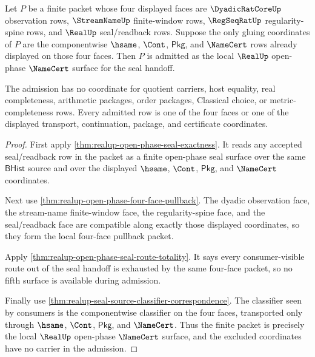 \begin{theorem}
\label{thm:realup-open-phase-four-face-namecert-admission}
Let $P$ be a finite packet whose four displayed faces are
$\DyadicRatCoreUp$ observation rows, $\StreamNameUp$ finite-window rows,
$\RegSeqRatUp$ regularity-spine rows, and $\RealUp$ seal/readback rows.
Suppose the only gluing coordinates of $P$ are the componentwise $\hsame$,
$\Cont$, $\mathsf{Pkg}$, and $\NameCert$ rows already displayed on those four
faces. Then $P$ is admitted as the local $\RealUp$ open-phase $\NameCert$
surface for the seal handoff.

The admission has no coordinate for quotient carriers, host equality, real
completeness, arithmetic packages, order packages, Classical choice, or
metric-completeness rows. Every admitted row is one of the four faces or one of
the displayed transport, continuation, package, and certificate coordinates.
\end{theorem}
\begin{proof}
First apply \autoref{thm:realup-open-phase-seal-exactness}. It reads any
accepted seal/readback row in the packet as a finite open-phase seal surface
over the same $\mathsf{BHist}$ source and over the displayed $\hsame$, $\Cont$,
$\mathsf{Pkg}$, and $\NameCert$ coordinates.

Next use \autoref{thm:realup-open-phase-four-face-pullback}. The dyadic
observation face, the stream-name finite-window face, the regularity-spine
face, and the seal/readback face are compatible along exactly those displayed
coordinates, so they form the local four-face pullback packet.

Apply \autoref{thm:realup-open-phase-seal-route-totality}. It says every
consumer-visible route out of the seal handoff is exhausted by the same
four-face packet, so no fifth surface is available during admission.

Finally use \autoref{thm:realup-seal-source-classifier-correspondence}. The
classifier seen by consumers is the componentwise classifier on the four faces,
transported only through $\hsame$, $\Cont$, $\mathsf{Pkg}$, and $\NameCert$.
Thus the finite packet is precisely the local $\RealUp$ open-phase
$\NameCert$ surface, and the excluded coordinates have no carrier in the
admission.
\end{proof}

